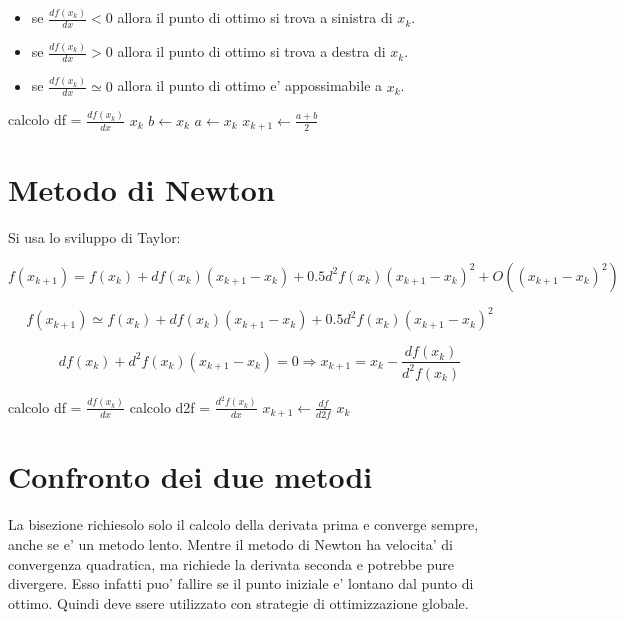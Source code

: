 \begin{itemize}
    \item se $\frac {df(x_k)} {dx} < 0$ allora il punto di ottimo si trova a sinistra di $x_k$.
    \item se $\frac {df(x_k)} {dx} > 0$ allora il punto di ottimo si trova a destra di $x_k$.
    \item se $\frac {df(x_k)} {dx} \simeq 0$ allora il punto di ottimo e' appossimabile a $x_k$.
\end{itemize}

\begin{algorithm}
    \begin{algorithmic}
                \State calcolo df = $\frac {df(x_k)} {dx}$
                    \State \Return $x_k$
                \Else
                        \State $b \gets x_k$
                    \Else
                        \State $a \gets x_k$
                    \EndIf
                \EndIf
                \State $x_{k+1} \gets \frac {a + b} 2$
            \EndWhile
        \EndProcedure
    \end{algorithmic}
\end{algorithm}

\section{Metodo di Newton}

Si usa lo sviluppo di Taylor:

\[
    f(x_{k+1}) = f(x_k) + df(x_k)(x_{k+1} - x_k) + 0.5 d^2f(x_k)(x_{k+1} - x_k)^2 + O((x_{k+1} - x_k)^2)
\]

\[
    f(x_{k+1}) \simeq f(x_k) + df(x_k)(x_{k+1} - x_k) + 0.5 d^2f(x_k)(x_{k+1} - x_k)^2
\]

\[
    df(x_k) + d^2f(x_k)(x_{k+1} - x_k) = 0 \Rightarrow x_{k+1} = x_k - \frac {df(x_k)} {d^2f(x_k)}
\]

\begin{algorithm}
    \begin{algorithmic}
                \State calcolo df = $\frac {df(x_k)} {dx}$
                \State calcolo d2f = $\frac {d^2f(x_k)} {dx}$
                \State $x_{k+1} \gets \frac {df} {d2f}$
                    \State \Return $x_k$
                \EndIf
            \EndWhile
        \EndProcedure
    \end{algorithmic}
\end{algorithm}

\section{Confronto dei due metodi}

La bisezione richiesolo solo il calcolo della derivata prima e converge sempre, anche se e' un metodo lento.
Mentre il metodo di Newton ha velocita' di convergenza quadratica, ma richiede la derivata seconda e potrebbe pure divergere.
Esso infatti puo' fallire se il punto iniziale e' lontano dal punto di ottimo. Quindi deve ssere utilizzato con strategie di ottimizzazione globale.

